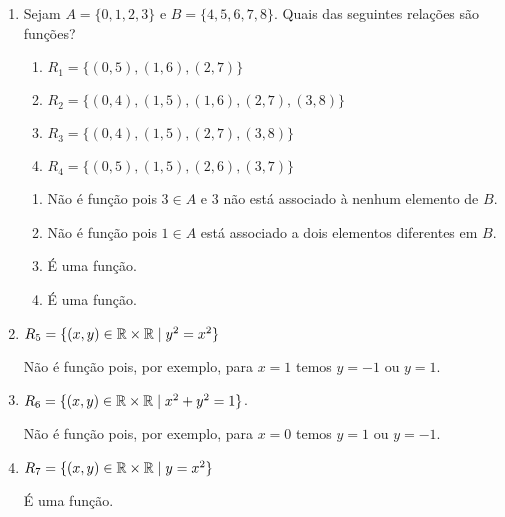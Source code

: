 \begin{exemplos}
    \begin{enumerate}[label={\arabic*})]
        \item Sejam $A = \{0,1,2,3\}$ e $B = \{4,5,6,7,8\}$. Quais das seguintes relações são funções?
            \begin{enumerate}[label={\alph*})]
                \item $R_1 = \{(0,5),(1,6),(2,7)\}$

                \item $R_2 = \{(0,4),(1,5),(1,6),(2,7),(3,8)\}$

                \item $R_3 = \{(0,4),(1,5),(2,7),(3,8)\}$

                \item $R_4 = \{(0,5),(1,5),(2,6),(3,7)\}$
            \end{enumerate}

            \begin{solucao}
                \begin{enumerate}[label={\alph*})]
                    \item Não é função pois $3 \in A$ e $3$ não está associado à nenhum elemento de $B$.

                    \item Não é função pois $1 \in A$ está associado a dois elementos diferentes em $B$.

                    \item É uma função.

                    \item É uma função.
                \end{enumerate}
            \end{solucao}

        \item $R_{5} = \{(x,y) \in \mathbb{R}  \times \mathbb{R}  \mid y^2 = x^2\}$
            \begin{solucao}
                 Não é função pois, por exemplo, para $x = 1$ temos $y = -1$ ou $y = 1$.
            \end{solucao}

        \item $R_{6} = \{(x,y) \in \mathbb{R}  \times \mathbb{R}  \mid x^2 + y^2 = 1\}$.
            \begin{solucao}
                 Não é função pois, por exemplo, para $x = 0$ temos $y = 1$ ou $y = -1$.
             \end{solucao}

        \item $R_{7} = \{(x,y) \in \mathbb{R}  \times \mathbb{R} \mid y = x^2\}$
            \begin{solucao}
                 É uma função.
            \end{solucao}
    \end{enumerate}
\end{exemplos}


